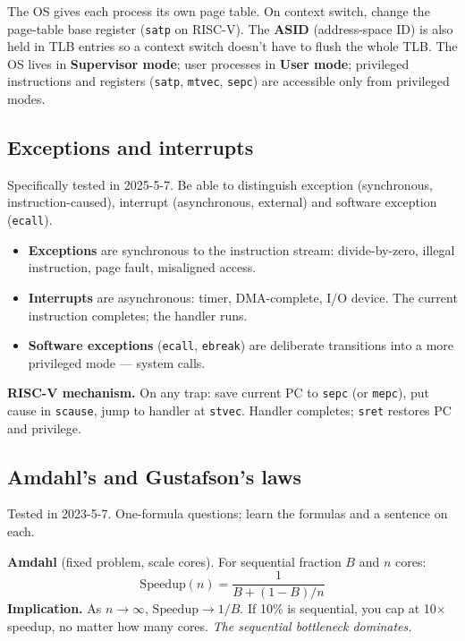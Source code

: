 \documentclass[11pt,a4paper]{article}
\begin{document}
The OS gives each process its own page table. On context switch, change the page-table base register (\verb|satp| on RISC-V). The \textbf{ASID} (address-space ID) is also held in TLB entries so a context switch doesn't have to flush the whole TLB. The OS lives in \textbf{Supervisor mode}; user processes in \textbf{User mode}; privileged instructions and registers (\verb|satp|, \verb|mtvec|, \verb|sepc|) are accessible only from privileged modes.

\subsection{Exceptions and interrupts}

\begin{useful}
Specifically tested in 2025-5-7. Be able to distinguish exception (synchronous, instruction-caused), interrupt (asynchronous, external) and software exception (\texttt{ecall}).
\end{useful}

\begin{itemize}[leftmargin=*,itemsep=1pt]
  \item \textbf{Exceptions} are synchronous to the instruction stream: divide-by-zero, illegal instruction, page fault, misaligned access.
  \item \textbf{Interrupts} are asynchronous: timer, DMA-complete, I/O device. The current instruction completes; the handler runs.
  \item \textbf{Software exceptions} (\verb|ecall|, \verb|ebreak|) are deliberate transitions into a more privileged mode --- system calls.
\end{itemize}

\textbf{RISC-V mechanism.} On any trap: save current PC to \verb|sepc| (or \verb|mepc|), put cause in \verb|scause|, jump to handler at \verb|stvec|. Handler completes; \verb|sret| restores PC and privilege.

\subsection{Amdahl's and Gustafson's laws}

\begin{useful}
Tested in 2023-5-7. One-formula questions; learn the formulas and a sentence on each.
\end{useful}

\textbf{Amdahl} (fixed problem, scale cores). For sequential fraction $B$ and $n$ cores:
$$\text{Speedup}(n) = \frac{1}{B + (1 - B)/n}$$
\textbf{Implication.} As $n \to \infty$, $\text{Speedup} \to 1/B$. If 10\% is sequential, you cap at 10$\times$ speedup, no matter how many cores. \emph{The sequential bottleneck dominates.}
\end{document}
